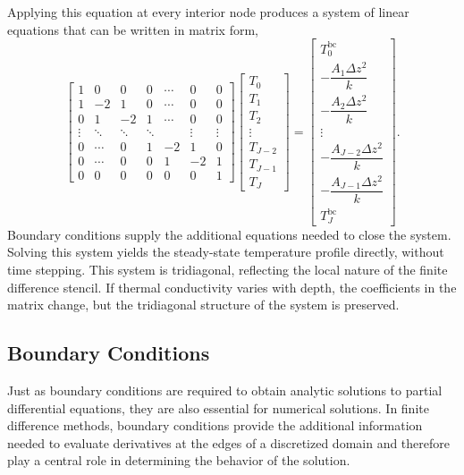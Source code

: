 Applying this equation at every interior node produces a system of linear
equations that can be written in matrix form,
\[
    \begin{bmatrix}
        1 & 0 & 0 & 0 & \cdots & 0 & 0 \\
        1 & -2 & 1 & 0 & \cdots & 0 & 0 \\
        0 & 1 & -2 & 1 & \cdots & 0 & 0 \\
        \vdots & \ddots & \ddots & \ddots & & \vdots & \vdots \\
        0 & \cdots & 0 & 1 & -2 & 1 & 0 \\
        0 & \cdots & 0 & 0 & 1 & -2 & 1 \\
        0 & 0 & 0 & 0 & 0 & 0 & 1
    \end{bmatrix}
    \begin{bmatrix}
        T_0 \\
        T_1 \\
        T_2 \\
        \vdots \\
        T_{J-2} \\
        T_{J-1} \\
        T_J
    \end{bmatrix}
    =
    \begin{bmatrix}
        T_0^{\text{bc}} \\
        -\dfrac{A_1 \Delta z^2}{k} \\
        -\dfrac{A_2 \Delta z^2}{k} \\
        \vdots \\
        -\dfrac{A_{J-2} \Delta z^2}{k} \\
        -\dfrac{A_{J-1} \Delta z^2}{k} \\
        T_J^{\text{bc}}
    \end{bmatrix}.
\]
Boundary conditions supply the additional equations needed to close the system. Solving this system yields the steady-state temperature profile directly, without time stepping.  This system is tridiagonal, reflecting the local nature of the finite difference stencil. If thermal conductivity varies with depth, the coefficients in the matrix change, but the tridiagonal structure of the system is preserved.

\subsection{Boundary Conditions}

Just as boundary conditions are required to obtain analytic solutions to partial differential equations, they are also essential for numerical solutions. In finite difference methods, boundary conditions provide the additional information needed to evaluate derivatives at the edges of a discretized domain and therefore play a central role in determining the
behavior of the solution.

